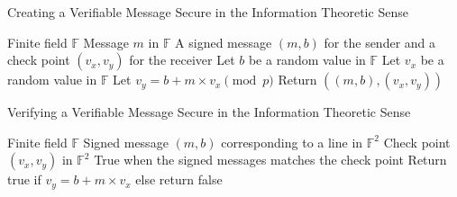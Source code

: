 \documentclass{dalcsthesis}
\begin{document}
\begin{algorithm}
  \caption{Creating a Verifiable Message Secure in the Information Theoretic Sense}
  \label{alg:CreatingVerifiableMessageForUnbounded}
  \begin{algorithmic}
    \INPUT Finite field $\mathbb{F}$
    \INPUT Message $m$ in $\mathbb{F}$
    \OUTPUT A signed message $(m, b)$ for the sender and a check point $(v_x, v_y)$ for the receiver
    \STATE Let $b$ be a random value in $\mathbb{F}$ 
    \STATE Let $v_x$ be a random value in $\mathbb{F}$
    \STATE Let $v_y = b + m \times v_x \pmod{p}$
    \STATE Return $((m, b), (v_x, v_y))$
  \end{algorithmic}
\end{algorithm}
\begin{algorithm}
  \caption{Verifying a Verifiable Message Secure in the Information Theoretic Sense}
  \label{alg:VerifyMessageForUnbounded}
  \begin{algorithmic}
    \INPUT Finite field $\mathbb{F}$
    \INPUT Signed message $(m, b)$ corresponding to a line in $\mathbb{F}^2$
    \INPUT Check point $(v_x, v_y)$ in $\mathbb{F}^2$
    \OUTPUT True when the signed messages matches the check point
    \STATE Return true if $v_y = b + m \times v_x$ else return false
  \end{algorithmic}
\end{algorithm}
\end{document}
